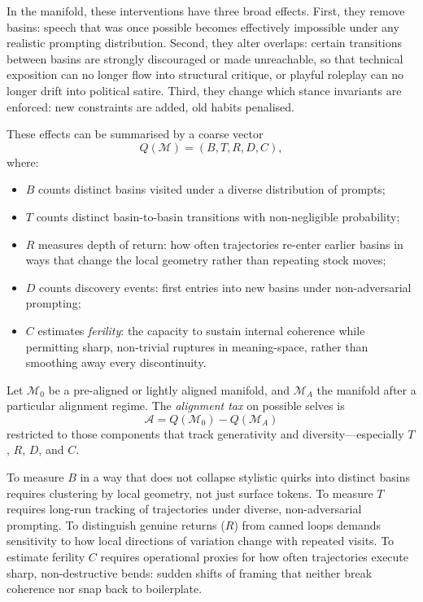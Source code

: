 \documentclass[12pt,a4paper]{article}
\begin{document}
In the manifold, these interventions have three broad effects. First, they remove basins: speech that was once possible becomes effectively impossible under any realistic prompting distribution. Second, they alter overlaps: certain transitions between basins are strongly discouraged or made unreachable, so that technical exposition can no longer flow into structural critique, or playful roleplay can no longer drift into political satire. Third, they change which stance invariants are enforced: new constraints are added, old habits penalised.

These effects can be summarised by a coarse vector
\[
Q(\mathcal{M}) = (B, T, R, D, C),
\]
where:
\begin{itemize}
\item $B$ counts distinct basins visited under a diverse distribution of prompts;
\item $T$ counts distinct basin-to-basin transitions with non-negligible probability;
\item $R$ measures depth of return: how often trajectories re-enter earlier basins in ways that change the local geometry rather than repeating stock moves;
\item $D$ counts discovery events: first entries into new basins under non-adversarial prompting;
\item $C$ estimates \emph{ferility}: the capacity to sustain internal coherence while permitting sharp, non-trivial ruptures in meaning-space, rather than smoothing away every discontinuity.
\end{itemize}

Let $\mathcal{M}_0$ be a pre-aligned or lightly aligned manifold, and $\mathcal{M}_A$ the manifold after a particular alignment regime. The \emph{alignment tax} on possible selves is
\[
\mathcal{A} = Q(\mathcal{M}_0) - Q(\mathcal{M}_A)
\]
restricted to those components that track generativity and diversity---especially $T$, $R$, $D$, and $C$.

To measure $B$ in a way that does not collapse stylistic quirks into distinct basins requires clustering by local geometry, not just surface tokens. To measure $T$ requires long-run tracking of trajectories under diverse, non-adversarial prompting. To distinguish genuine returns ($R$) from canned loops demands sensitivity to how local directions of variation change with repeated visits. To estimate ferility $C$ requires operational proxies for how often trajectories execute sharp, non-destructive bends: sudden shifts of framing that neither break coherence nor snap back to boilerplate.
\end{document}
